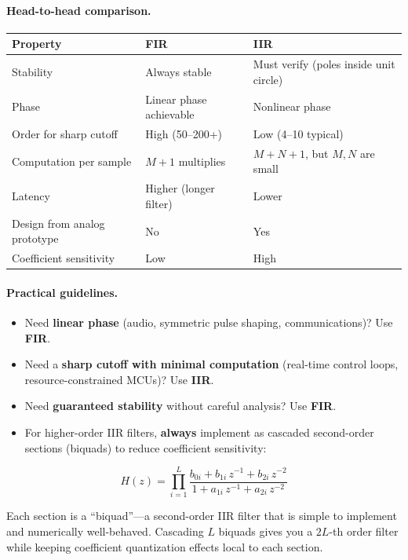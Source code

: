 \paragraph{Head-to-head comparison.}

\begin{center}
\begin{tabular}{lll}
\toprule
\textbf{Property} & \textbf{FIR} & \textbf{IIR} \\
\midrule
Stability & Always stable & Must verify (poles inside unit circle) \\
Phase & Linear phase achievable & Nonlinear phase \\
Order for sharp cutoff & High (50--200+) & Low (4--10 typical) \\
Computation per sample & $M+1$ multiplies & $M+N+1$, but $M,N$ are small \\
Latency & Higher (longer filter) & Lower \\
Design from analog prototype & No & Yes \\
Coefficient sensitivity & Low & High \\
\bottomrule
\end{tabular}
\end{center}

\paragraph{Practical guidelines.}
\begin{itemize}
    \item Need \textbf{linear phase} (audio, symmetric pulse shaping, communications)?
          Use \textbf{FIR}.
    \item Need a \textbf{sharp cutoff with minimal computation} (real-time control
          loops, resource-constrained MCUs)? Use \textbf{IIR}.
    \item Need \textbf{guaranteed stability} without careful analysis? Use
          \textbf{FIR}.
    \item For higher-order IIR filters, \textbf{always} implement as cascaded
          second-order sections (biquads) to reduce coefficient sensitivity:
\end{itemize}
\begin{equation}
H(z) = \prod_{i=1}^{L}
       \frac{b_{0i} + b_{1i}\,z^{-1} + b_{2i}\,z^{-2}}
            {1   + a_{1i}\,z^{-1} + a_{2i}\,z^{-2}}
\end{equation}

Each section is a ``biquad''---a second-order IIR filter that is simple to
implement and numerically well-behaved. Cascading $L$ biquads gives you a
$2L$-th order filter while keeping coefficient quantization effects local to each
section.

